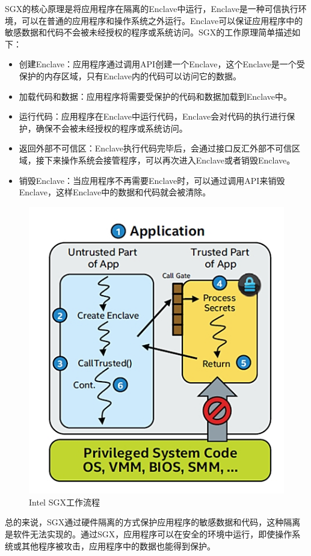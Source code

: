 \documentclass[twocolumn]{source/Paper}
\begin{document}
    SGX的核心原理是将应用程序在隔离的Enclave中运行，Enclave是一种可信执行环境，可以在普通的应用程序和操作系统之外运行。Enclave可以保证应用程序中的敏感数据和代码不会被未经授权的程序或系统访问。SGX的工作原理简单描述如下：
    \begin{itemize}
        \item 创建Enclave：应用程序通过调用API创建一个Enclave，这个Enclave是一个受保护的内存区域，只有Enclave内的代码可以访问它的数据。
        \item 加载代码和数据：应用程序将需要受保护的代码和数据加载到Enclave中。
        \item 运行代码：应用程序在Enclave中运行代码，Enclave会对代码的执行进行保护，确保不会被未经授权的程序或系统访问。
        \item 返回外部不可信区：Enclave执行代码完毕后，会通过接口反汇外部不可信区域，接下来操作系统会接管程序，可以再次进入Enclave或者销毁Enclave。
        \item 销毁Enclave：当应用程序不再需要Enclave时，可以通过调用API来销毁Enclave，这样Enclave中的数据和代码就会被清除。
    \end{itemize}

    \begin{figure}[H]
        \centering
        \includegraphics[width=0.4\linewidth]{pic/intelsgx.jpg}
        \caption{Intel SGX工作流程}
        \label{intelsgx}
    \end{figure}
    
    总的来说，SGX通过硬件隔离的方式保护应用程序的敏感数据和代码，这种隔离是软件无法实现的。通过SGX，应用程序可以在安全的环境中运行，即使操作系统或其他程序被攻击，应用程序中的数据也能得到保护。
\end{document}
